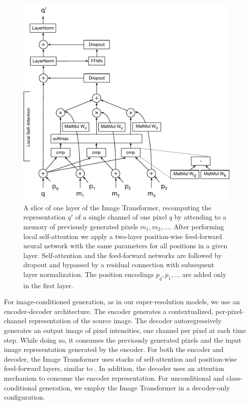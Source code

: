\begin{figure}
  \centering
  \includegraphics[scale=0.44]{ImageTransformerDiagram.pdf}
  \caption{A slice of one layer of the Image Transformer, recomputing the representation $q'$ of a single channel of one pixel $q$ by attending to a memory of previously generated pixels $m_1, m_2, \ldots$. After performing local self-attention we apply a two-layer position-wise feed-forward neural network with the same parameters for all positions in a given layer. Self-attention and the feed-forward networks are followed by dropout and bypassed by a residual connection with subsequent layer normalization. The position encodings $p_q, p_1, \ldots$ are added only in the first layer.}
  \label{fig:model-arch}
\end{figure}

For image-conditioned generation, as in our super-resolution models, we use an encoder-decoder architecture. The encoder generates a contextualized, per-pixel-channel representation of the source image.
The decoder autoregressively generates an output image of pixel intensities, one channel per pixel at each time step. While doing so, it consumes the previously generated pixels and the input image representation generated by the encoder. For both the encoder and decoder, the Image Transformer uses stacks of self-attention and position-wise feed-forward layers, similar to \citep{aiayn}. In addition, the decoder uses an attention mechanism to consume the encoder representation. For unconditional and class-conditional generation, we employ the Image Transformer in a decoder-only configuration.

